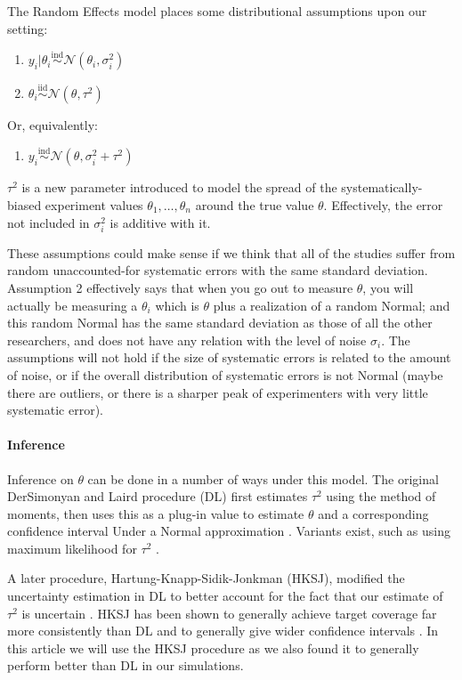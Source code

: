 \documentclass[letterpaper,12pt]{article}
\begin{document}
The Random Effects model places some distributional assumptions upon our setting:

\begin{enumerate}
\item
  $y_i|\theta_i\overset{\mathrm{ind}}{\sim}\mathcal{N}(\theta_i,\sigma_i^2)$
\item
  $\theta_i\overset{\mathrm{iid}}{\sim}\mathcal{N}(\theta,\tau^2)$
\end{enumerate}
Or, equivalently:
\begin{enumerate}
  \item $y_i\overset{\mathrm{ind}}{\sim}\mathcal{N}(\theta,\sigma_i^2+\tau^2)$
\end{enumerate}

$\tau^2$ is a new parameter introduced to model the spread of the systematically-biased experiment values $\theta_1,\ldots,\theta_n$ around the true value $\theta$. Effectively, the error not included in $\sigma_i^2$ is additive with it.

These assumptions could make sense if we think that all of the studies suffer from random unaccounted-for systematic errors with the same standard deviation. Assumption 2 effectively says that when you go out to measure $\theta$, you will actually be measuring a $\theta_i$ which is $\theta$ plus a realization of a random Normal; and this random Normal has the same standard deviation as those of all the other researchers, and does not have any relation with the level of noise $\sigma_i$. The assumptions will not hold if the size of systematic errors is related to the amount of noise, or if the overall distribution of systematic errors is not Normal (maybe there are outliers, or there is a sharper peak of experimenters with very little systematic error).

\paragraph{Inference}\label{inference}

Inference on $\theta$ can be done in a number of ways under this model. The original DerSimonyan and Laird procedure (DL) first estimates $\tau^2$ using the method of moments, then uses this as a plug-in value to estimate $\theta$ and a corresponding confidence interval Under a Normal approximation \citep{dersimonian1986meta}. Variants exist, such as using maximum likelihood for $\tau^2$ \citep{dersimonian1986meta,jackson2010does}.

A later procedure, Hartung-Knapp-Sidik-Jonkman (HKSJ), modified the uncertainty estimation in DL to better account for the fact that our estimate of $\tau^2$ is uncertain \citep{hartung1999alternative,sidik2002simple}. HKSJ has been shown to generally achieve target coverage far more consistently than DL \citep{inthout2014hartung} and to generally give wider confidence intervals \citep{wiksten2016hartung}. In this article we will use the HKSJ procedure as we also found it to generally perform better than DL in our simulations.
\end{document}
